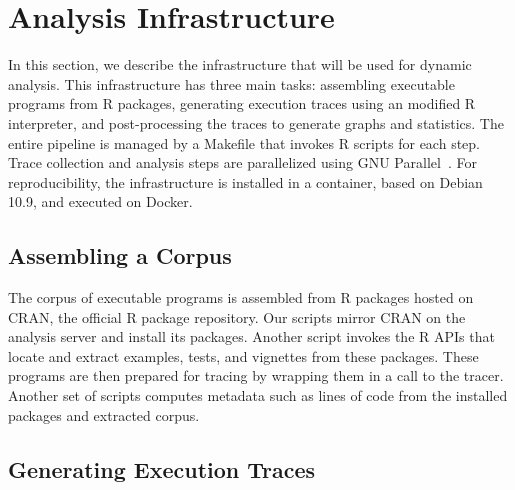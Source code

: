 \documentclass[10pt,review,sigplan,anonymous=true,authorversion=true,nonacm=true]{acmart}
\begin{document}
\section{Analysis Infrastructure}

In this section, we describe the infrastructure that will be used for dynamic
analysis. This infrastructure has three main tasks: assembling executable
programs from R packages, generating execution traces using an modified R
interpreter, and post-processing the traces to generate graphs and statistics.
The entire pipeline is managed by a Makefile that invokes R scripts for each
step. Trace collection and analysis steps are parallelized using GNU
Parallel~\cite{gnuparallel}. For reproducibility, the infrastructure is
installed in a container, based on Debian 10.9, and executed on Docker.

\subsection{Assembling a Corpus}

The corpus of executable programs is assembled from R packages hosted on CRAN,
the official R package repository. Our scripts mirror CRAN on the analysis
server and install its packages. Another script invokes the R APIs that
locate and extract examples, tests, and vignettes from these packages. These
programs are then prepared for tracing by wrapping them in a call to the tracer.
Another set of scripts computes metadata such as lines of code from the
installed packages and extracted corpus.

\subsection{Generating Execution Traces}
\end{document}
